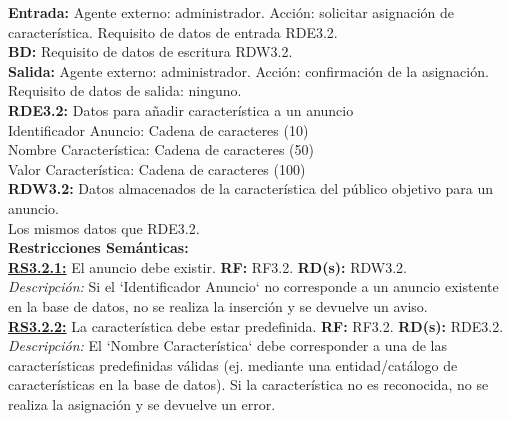 \textbf{\textcolor{rojo}{Entrada:}} Agente externo: administrador. Acción: solicitar asignación de característica. 
Requisito de datos de entrada \textcolor{azul}{RDE3.2}. \\[6pt]

\textbf{\textcolor{rojo}{BD:}} Requisito de datos de escritura \textcolor{azul}{RDW3.2}. \\[6pt]

\textbf{\textcolor{rojo}{Salida:}} Agente externo: administrador. Acción: confirmación de la asignación. 
Requisito de datos de salida: ninguno. \\[12pt]

\textcolor{azul}{\textbf{RDE3.2:}} Datos para añadir característica a un anuncio \\
\hspace*{1cm} Identificador Anuncio: Cadena de caracteres (10) \\
\hspace*{1cm} Nombre Característica: Cadena de caracteres (50) \\
\hspace*{1cm} Valor Característica: Cadena de caracteres (100) \\[12pt]

\textcolor{azul}{\textbf{RDW3.2:}} Datos almacenados de la característica del público objetivo para un anuncio. \\
\hspace*{1cm} Los mismos datos que RDE3.2. \\[12pt]


\textbf{\textcolor{verde}{Restricciones Semánticas:}} \\[6pt]
\textbf{\textcolor{verde}{\underline{RS3.2.1:}}} El anuncio debe existir. \textbf{RF:} RF3.2. \textbf{RD(s):} RDW3.2. \\
\hspace*{1cm} \textit{Descripción:} Si el `Identificador Anuncio` no corresponde a un anuncio existente en la base de datos, no se realiza la inserción y se devuelve un aviso. \\
\textbf{\textcolor{verde}{\underline{RS3.2.2:}}} La característica debe estar predefinida. \textbf{RF:} RF3.2. \textbf{RD(s):} RDE3.2. \\
\hspace*{1cm} \textit{Descripción:} El `Nombre Característica` debe corresponder a una de las características predefinidas válidas (ej. mediante una entidad/catálogo de características en la base de datos). Si la característica no es reconocida, no se realiza la asignación y se devuelve un error.



